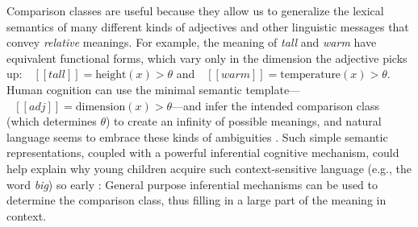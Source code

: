 \documentclass[doc]{apa6}
\newcommand{\denote}[1]{\mbox{ $[\![ #1 ]\!]$}}
\newcommand{\mht}[1]{\textcolor{Blue}{[mht: #1]}}
\begin{document}


Comparison classes are useful because they allow us to generalize the lexical semantics of many different kinds of adjectives and other linguistic messages that convey \emph{relative} meanings.
For example, the meaning of \emph{tall} and \emph{warm} have equivalent functional forms, which vary only in the dimension the adjective picks up: $\denote{tall} = \text{height}(x) > \theta$ and $\denote{warm} = \text{temperature}(x) > \theta$.
Human cognition can use the minimal semantic template---$\denote{adj} = \text{dimension}(x) > \theta$---and infer the intended comparison class (which determines $\theta$) to create an infinity of possible meanings, and natural language seems to embrace these kinds of ambiguities \cite{piantadosi2012communicative}.
Such simple semantic representations, coupled with a powerful inferential cognitive mechanism, could help explain why young children acquire such context-sensitive language (e.g., the word \emph{big}) so early \cite{Sera1987,Ebeling1988,Mintz2002,Sandhofer2007}: General purpose inferential mechanisms can be used to determine the comparison class, thus filling in a large part of the meaning in context.
\end{document}
